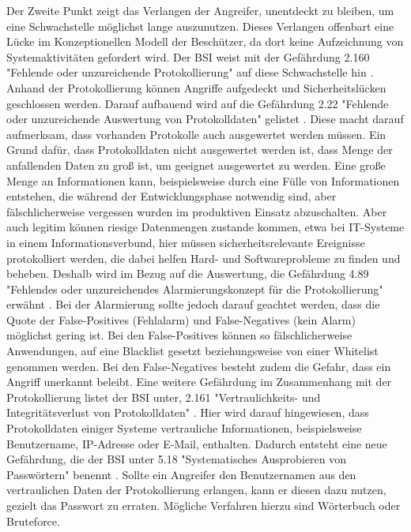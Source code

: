 \documentclass[11pt,a4paper]{report}
\begin{document}
Der Zweite Punkt zeigt das Verlangen der Angreifer, unentdeckt zu bleiben, um eine Schwachstelle möglichst lange auszunutzen. Dieses Verlangen offenbart eine Lücke im Konzeptionellen Modell der Beschützer, da dort keine Aufzeichnung von Systemaktivitäten gefordert wird. Der BSI weist mit der Gefährdung 2.160 "Fehlende oder unzureichende Protokollierung" auf diese Schwachstelle hin \cite{bsi_g2160}. Anhand der Protokollierung können Angriffe aufgedeckt und Sicherheitslücken geschlossen werden. Darauf aufbauend wird auf die Gefährdung 2.22 "Fehlende oder unzureichende Auswertung von Protokolldaten" gelistet \cite{bsi_g2022}. Diese macht darauf aufmerksam, dass vorhanden Protokolle auch ausgewertet werden müssen. Ein Grund dafür, dass Protokolldaten nicht ausgewertet werden ist, dass Menge der anfallenden Daten zu groß ist, um geeignet ausgewertet zu werden. Eine große Menge an Informationen kann, beispielsweise durch eine Fülle von Informationen entstehen, die während der Entwicklungsphase notwendig sind, aber fälschlicherweise vergessen wurden im produktiven Einsatz abzuschalten. Aber auch legitim können riesige Datenmengen zustande kommen, etwa bei IT-Systeme in einem Informationsverbund, hier müssen sicherheitsrelevante Ereignisse protokolliert werden, die dabei helfen Hard- und Softwareprobleme zu finden und beheben. Deshalb wird im Bezug auf die Auswertung, die Gefährdung 4.89 "Fehlendes oder unzureichendes Alarmierungskonzept für die Protokollierung" erwähnt \cite{bsi_g4089}. Bei der Alarmierung sollte jedoch darauf geachtet werden, dass die Quote der False-Positives (Fehlalarm) und False-Negatives (kein Alarm) möglichst gering ist. Bei den False-Positives können so fälschlicherweise Anwendungen, auf eine Blacklist gesetzt beziehungsweise von einer Whitelist genommen werden. Bei den False-Negatives besteht zudem die Gefahr, dass ein Angriff unerkannt beleibt. Eine weitere Gefährdung im Zusammenhang mit der Protokollierung listet der BSI unter, 2.161 "Vertraulichkeits- und Integritätsverlust von Protokolldaten" \cite{bsi_g2161}. Hier wird darauf hingewiesen, dass  Protokolldaten einiger Systeme vertrauliche Informationen, beispielsweise Benutzername, IP-Adresse oder E-Mail, enthalten.	Dadurch entsteht eine neue Gefährdung, die der BSI unter 5.18 "Systematisches Ausprobieren von Passwörtern" benennt \cite{bsi_g5018}. Sollte ein Angreifer den Benutzernamen aus den vertraulichen Daten der Protokollierung erlangen, kann er diesen dazu nutzen, gezielt das Passwort zu erraten. Mögliche Verfahren hierzu sind Wörterbuch oder Bruteforce.
\end{document}
